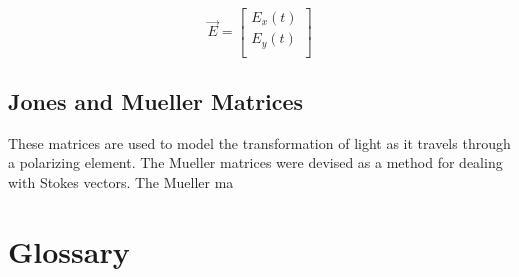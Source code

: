 \documentclass[12pt]{report}
\begin{document}
\[\vec{E} = \left[\begin{array}{c}
E_x(t) \\
E_y(t) \\

\end{array} \right]\]
\subsection{Jones and Mueller Matrices}
These matrices are used to model the transformation of light as it travels through a polarizing element. The Mueller matrices were devised as a method for dealing with Stokes vectors. The Mueller ma

\section{Glossary}
\end{document}
